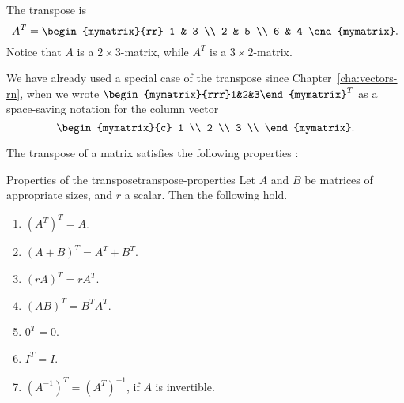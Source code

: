 \begin{solution}
  The transpose is
  \begin{equation*}
    A^T =
    \begin{mymatrix}{rr}
      1 & 3 \\
      2 & 5 \\
      6 & 4
    \end{mymatrix}.
  \end{equation*}
  Notice that $A$ is a $2\times 3$-matrix, while $A^T$ is a
  $3\times 2$-matrix.
\end{solution}

We have already used a special case of the transpose since
Chapter~\ref{cha:vectors-rn}, when we wrote
$\begin{mymatrix}{rrr}1&2&3\end{mymatrix}^T$ as a space-saving
notation for the column vector
\begin{equation*}
  \begin{mymatrix}{c}
    1 \\
    2 \\
    3 \\
  \end{mymatrix}.
\end{equation*}

The transpose of a matrix satisfies the following
properties%
%
%
:

\begin{proposition}{Properties of the transpose}{transpose-properties}
  Let $A$ and $B$ be matrices of appropriate sizes, and $r$ a
  scalar. Then the following hold.
  \begin{enumerate}
  \item $(A^T)^T = A$.
  \item $(A+B)^T=A^T+B^T$.\label{matrix-transpose-2}
  \item $(rA)^T=rA^T$.\label{matrix-transpose-3}
  \item $(AB)^T=B^TA^T$.\label{matrix-transpose-4}
  \item $0^T = 0$.
  \item $I^T = I$.
  \item $(A^{-1})^T = (A^T)^{-1}$, if $A$ is invertible.
  \end{enumerate}
\end{proposition}

